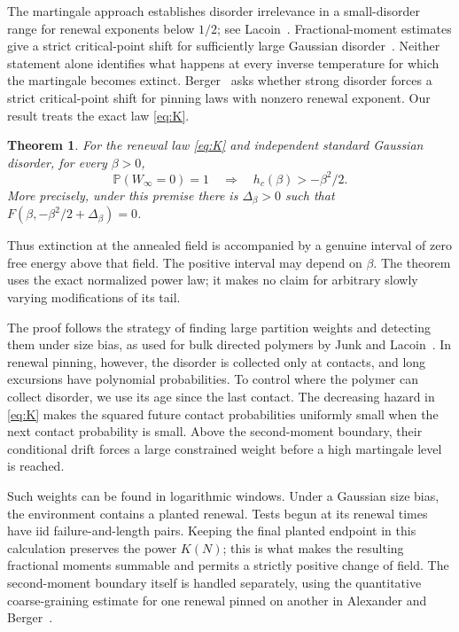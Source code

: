 \documentclass[11pt]{article}
\newtheorem{theorem}{Theorem}[section]
\theoremstyle{remark}
\numberwithin{equation}{section}
\newcommand{\Penv}{\mathbb P}
\begin{document}
The martingale approach establishes disorder irrelevance in a small-disorder
range for renewal exponents below $1/2$; see Lacoin~\cite{Lacoin}.
Fractional-moment estimates give a strict critical-point shift for
sufficiently large Gaussian disorder~\cite{Toninelli}. Neither statement
alone identifies what happens at every inverse temperature for which the
martingale becomes extinct. Berger~\cite[Conjecture~4.9]{Berger} asks whether
strong disorder forces a strict critical-point shift for pinning laws with
nonzero renewal exponent. Our result treats the exact law \eqref{eq:K}.

\begin{theorem}\label{thm:main}
For the renewal law \eqref{eq:K} and independent standard Gaussian disorder,
for every $\beta>0$,
\[
 \Penv(W_\infty=0)=1
 \quad\Longrightarrow\quad h_c(\beta)>-\beta^2/2.
\]
More precisely, under this premise there is $\Delta_\beta>0$ such that
$F(\beta,-\beta^2/2+\Delta_\beta)=0$.
\end{theorem}

Thus extinction at the annealed field is accompanied by a genuine interval
of zero free energy above that field. The positive interval may depend on
$\beta$. The theorem uses the exact normalized power law; it makes no claim
for arbitrary slowly varying modifications of its tail.

The proof follows the strategy of finding large partition weights and
detecting them under size bias, as used for bulk directed polymers by Junk
and Lacoin~\cite{JL}. In renewal pinning, however, the disorder is collected
only at contacts, and long excursions have polynomial probabilities. To
control where the polymer can collect disorder, we use its age since the
last contact. The decreasing hazard in \eqref{eq:K} makes the squared future
contact probabilities uniformly small when the next contact probability is
small. Above the second-moment boundary, their conditional drift forces a
large constrained weight before a high martingale level is reached.

Such weights can be found in logarithmic windows. Under a Gaussian size
bias, the environment contains a planted renewal. Tests begun at its renewal
times have iid failure-and-length pairs. Keeping the final planted endpoint
in this calculation preserves the power $K(N)$; this is what makes the
resulting fractional moments summable and permits a strictly positive change
of field. The second-moment boundary itself is handled separately, using
the quantitative coarse-graining estimate for one renewal pinned on another
in Alexander and Berger~\cite{AB}.
\end{document}
